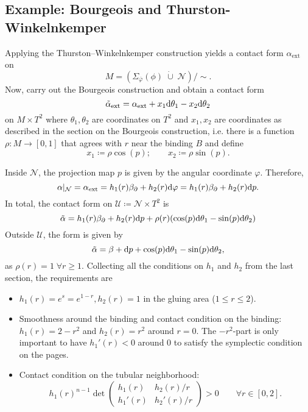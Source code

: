 \subsection{Example: Bourgeois and Thurston-Winkelnkemper}
Applying the Thurston--Winkelnkemper construction yields a contact form $\alpha_\text{ext}$ on
\[
    M = \left(\Sigma_{\overline{\varphi}}(\phi)\; \dot\cup\; \mathcal{N}\right)/\sim.
\]
Now, carry out the Bourgeois construction and obtain a contact form
\[
    \tilde \alpha_\text{ext} = \alpha_\text{ext} + x_1 \mathrm{d} \theta_1 - x_2 \mathrm{d}\theta_2
\]
on $M \times T^2$ where $\theta_1, \theta_2$ are coordinates on $T^2$
and $x_1, x_2$ are coordinates as described in the section on the Bourgeois construction, 
i.e. there is a function $\rho: M \to [0,1]$ that agrees with $r$ near the binding $B$ and define
\[
    x_1 \coloneqq \rho \cos(p);\qquad x_2 \coloneqq \rho \sin(p).
\]

Inside $\mathcal{N}$, the projection map $p$ is given by the angular coordinate $\varphi$. Therefore,
\[
    \alpha|_\mathcal{N} = \alpha_\text{ext} = h_1(r)\beta_\partial + h_2(r)\mathrm{d} \varphi = h_1(r)\beta_\partial + h_2(r)\mathrm{d} p.
\]
In total, the contact form on $\mathcal{U} \coloneqq \mathcal{N}\times T^2$ is
\[
    \tilde \alpha = h_1(r)\beta_\partial + h_2(r)\mathrm{d} p + \rho(r)(\cos(p) \mathrm{d} \theta_1 - \sin(p) \mathrm{d} \theta_2)
\]
Outside $\mathcal{U}$, the form is given by
\[
    \tilde \alpha = \beta + \mathrm{d} p + \cos(p) \mathrm{d}\theta_1 - \sin(p) \mathrm{d} \theta_2,
\]
as $\rho(r) = 1\; \forall r \geq 1$.
Collecting all the conditions on $h_1$ and $h_2$ from the last section, the requirements are
\begin{itemize}
    \item $h_1(r) = e^s = e^{1-r}, h_2(r) = 1$ in the gluing area ($ 1 \le r \le 2$).
    \item Smoothness around the binding and contact condition on the binding: $h_1(r) = 2 - r^2$ and $h_2(r) = r^2$ around $r = 0$.
    The $-r^2$-part is only important to have $h_1'(r) < 0$ around $0$ to satisfy the symplectic condition on the pages.
    \item Contact condition on the tubular neighborhood: \[
        h_1(r)^{n-1}\det \begin{pmatrix}
            h_1(r) & h_2(r)/r\\
            h_1'(r) & h_2'(r)/r
        \end{pmatrix} > 0 \qquad \forall r \in [0,2].
    \]
\end{itemize}

